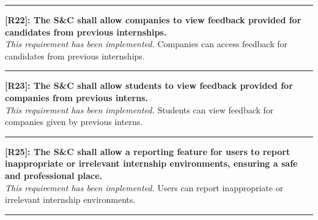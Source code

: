\noindent\rule{16cm}{0.4pt}

\noindent\textbf{[R22]: The S\&C shall allow companies to view feedback provided for candidates from previous internships.} \\
\textit{This requirement has been implemented.} Companies can access feedback for candidates from previous internships.

\noindent\rule{16cm}{0.4pt}

\noindent\textbf{[R23]: The S\&C shall allow students to view feedback provided for companies from previous interns.} \\
\textit{This requirement has been implemented.} Students can view feedback for companies given by previous interns.

\noindent\rule{16cm}{0.4pt}

\noindent\textbf{[R25]: The S\&C shall allow a reporting feature for users to report inappropriate or irrelevant internship environments, ensuring a safe and professional place.} \\
\textit{This requirement has been implemented.} Users can report inappropriate or irrelevant internship environments.

\noindent\rule{16cm}{0.4pt}

